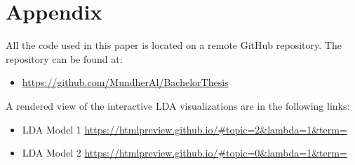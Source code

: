 \section*{Appendix}

All the code used in this paper is located on a remote GitHub repository. The repository can be found at:


\begin{itemize}
    \item \url{https://github.com/MundherAl/BachelorThesis}
\end{itemize}

A rendered view of the interactive LDA visualizations are in the following links:

\begin{itemize}
    \item LDA Model 1 \url{https://htmlpreview.github.io/#topic=2&lambda=1&term=}
    \item LDA Model 2 \url{https://htmlpreview.github.io/#topic=0&lambda=1&term=}
\end{itemize}

